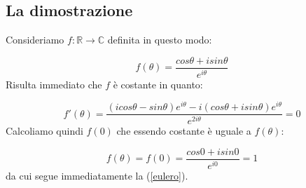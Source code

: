 \begin{multicols}{2}
    \section{La dimostrazione}
    
    Consideriamo $f:\mathbb{R}\longrightarrow\mathbb{C}$ definita in questo modo:
    
    \begin{equation}
    	f(\theta)=\frac{cos\theta+isin\theta}{e^{i\theta}}
    \end{equation}	
	 Risulta immediato che $f$ è costante in quanto:
	 
	 \begin{equation*}
	 	f'(\theta)=\frac{(icos\theta-sin\theta)e^{i\theta}-i(cos\theta+isin\theta)e^{i\theta}}{e^{2i\theta}}=0
	 \end{equation*}
     Calcoliamo quindi $f(0)$ che essendo costante è uguale a $f(\theta)$:
     
     \begin{equation*}
     	f(\theta)=f(0)=\frac{cos0+isin0}{e^{i0}}=1
     \end{equation*}
     da cui segue immediatamente la (\ref{eulero}).
\end{multicols}
